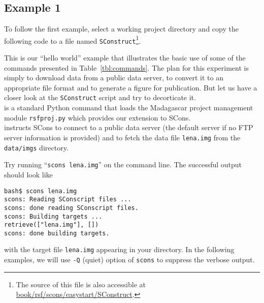 \subsection{Example 1}

To follow the first example, select a working project directory and
copy the following code
to a file named \texttt{SConstruct}\footnote{The source of this file is also accessible at \href{http://svn.sourceforge.net/viewvc/rsf/trunk/book/rsf/scons/easystart/SConstruct?view=markup}{book/rsf/scons/easystart/SConstruct}.}.

%


This is our ``hello  world'' example that illustrates the basic use of
some of the commands presented in Table~\ref{tbl:commands}. The plan
for this experiment is simply to download data from a public data
server, to convert it to an appropriate file format and to generate a
figure for publication. But let us have a closer look at the
\texttt{SConstruct} script and try to decorticate it.\\


%
is a standard Python command that loads the Madagascar project
management module \texttt{rsfproj.py} which provides our extension to
SCons.\\


%
instructs SCons to connect to a public data server (the default server
if no FTP server information is provided) and to fetch the data file
\texttt{lena.img} from the \texttt{data/imgs} directory. 
\begin{comment}
Note that
Madagascar expects a \texttt{data} folder on top of the specified
directory (i.e.  \texttt{imgs}). In the directory where you have your
SConstruct, running \texttt{scons lena.img} on the command line will
download the file \texttt{lena.img}.  The equivalent command lines are
\footnote{use login: anonymous, password: anonymous}
\begin{verbatim}
bash$ ftp egl.beg.utexas.edu
ftp> bin
ftp> cd data/imgs
ftp> get lena.img
ftp> bye
\end{verbatim}
\end{comment}
%
Try running ``\texttt{scons lena.img}'' on the command line. The successful output should look like
\begin{verbatim}
bash$ scons lena.img
scons: Reading SConscript files ...
scons: done reading SConscript files.
scons: Building targets ...
retrieve(["lena.img"], [])
scons: done building targets.
\end{verbatim}
with the target file \texttt{lena.img} appearing in your directory.
In the following examples, we will use \texttt{-Q} (quiet) option of
\texttt{scons} to suppress the verbose output.

